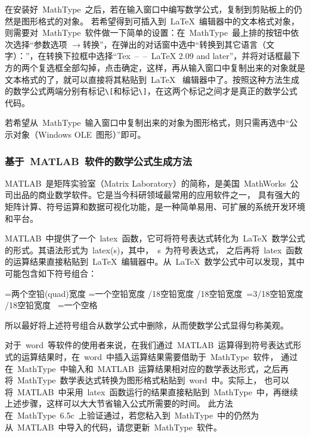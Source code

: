 在安装好~MathType~之后，若在输入窗口中编写数学公式，复制到剪贴板上的仍然是图形格式的对象。
若希望得到可插入到~\LaTeX~编辑器中的文本格式对象，则需要对~MathType~软件做一下简单的设置：在~MathType~最上排的按钮中依次选择“参数选项
$\to$转换”，在弹出的对话窗中选中“转换到其它语言（文字）：”，在转换下拉框中选择“Tex~--~--~LaTeX 2.09 and later”，并将对话框最下方的两个复选框全部勾掉，点击确定，这样，再从输入窗口中复制出来的对象就是文本格式的了，就可以直接将其粘贴到~\LaTeX~
编辑器中了。按照这种方法生成的数学公式两端分别有标记\verb|\[|和标记\verb|\]|，在这两个标记之间才是真正的数学公式代码。

若希望从~MathType~输入窗口中复制出来的对象为图形格式，则只需再选中“公示对象（Windows OLE~图形）”即可。

\subsubsection{基于~MATLAB~软件的数学公式生成方法}
MATLAB~是矩阵实验室（Matrix Laboratory）的简称，是美国~MathWorks~公司出品的商业数学软件。它是当今科研领域最常用的应用软件之一，
具有强大的矩阵计算、符号运算和数据可视化功能，是一种简单易用、可扩展的系统开发环境和平台。

MATLAB~中提供了一个~latex~函数，它可将符号表达式转化为~\LaTeX~数学公式的形式。其语法形式为~latex(s)，其中，~s~为符号表达式，
之后再将~latex~函数的运算结果直接粘贴到~\LaTeX~编辑器中。从~\LaTeX~数学公式中可以发现，其中可能包含如下符号组合：
\begin{verbatim*}
\qquad=两个空铅(quad)宽度
\quad=一个空铅宽度
/18空铅宽度
/18空铅宽度
\,=3/18空铅宽度
/18空铅宽度
\ =一个空格
\end{verbatim*}
所以最好将上述符号组合从数学公式中删除，从而使数学公式显得匀称美观。

对于~word~等软件的使用者来说，在我们通过~MATLAB~运算得到符号表达式形式的运算结果时，在~word~中插入运算结果需要借助于~MathType~软件，
通过在~MathType~中输入和~MATLAB~运算结果相对应的数学表达形式，之后再将~MathType~数学表达式转换为图形格式粘贴到~word~中。实际上，
也可以将~MATLAB~中采用~latex~函数运行的结果直接粘贴到~MathType~中，再继续上述步骤，这样可以大大节省输入公式所需要的时间。
此方法在~MathType~6.5c~上验证通过，若您粘入到~MathType~中的仍然为从~MATLAB~中导入的代码，请您更新~MathType~软件。


